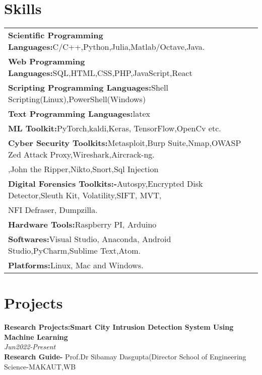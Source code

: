 \documentclass[a4paper,12pt]{article}
\begin{document}
\section{Skills}
\begin{tabularx}{\linewidth}{@{}l X@{}}
\textbf{Scientific Programming Languages:}\normalsize{C/C++,Python,Julia,Matlab/Octave,Java.}\\[2.75pt]
\textbf{Web Programming Languages:}\normalsize{SQL,HTML,CSS,PHP,JavaScript,React}\\[2.75pt]
\textbf{Scripting Programming Languages:}\normalsize{Shell Scripting(Linux),PowerShell(Windows)}\\[2.75pt]
\textbf{Text Programming Languages:}\normalsize{latex}\\[2.75pt]
\textbf{ML Toolkit:}\normalsize{PyTorch,kaldi,Keras, TensorFlow,OpenCv etc.}\\[2.75pt]
\textbf{Cyber Security Toolkits:}\normalsize{Metasploit,Burp Suite,Nmap,OWASP Zed Attack Proxy,Wireshark,Aircrack-ng.}\\[0.72pt]
,John the Ripper,Nikto,Snort,Sql Injection \\
\textbf{Digital Forensics Toolkits:-}\normalsize{Autospy,Encrypted Disk Detector,Sleuth Kit, Volatility,SIFT, MVT,}\\[0.72pt]
NFI Defraser, Dumpzilla.\\
\textbf{Hardware Tools:}\normalsize{Raspberry PI, Arduino}\\[0.72pt]
\textbf{Softwares:}\normalsize{Visual Studio, Anaconda, Android Studio,PyCharm,Sublime Text,Atom.}\\
\textbf{Platforms:}\normalsize{Linux, Mac and Windows.}\\[0.72pt]


\end{tabularx}
\section{Projects
}
\textbf{Research Projects:Smart City Intrusion Detection System Using Machine Learning}\\[0.69pt]                                                                                                    
        \textit{Jun2022-Present}\\[0.80pt]   
\textbf{Research Guide-}       
Prof.Dr Sibamay Dasgupta(Director School of Engineering Science-MAKAUT,WB 
                                        
\end{document}

